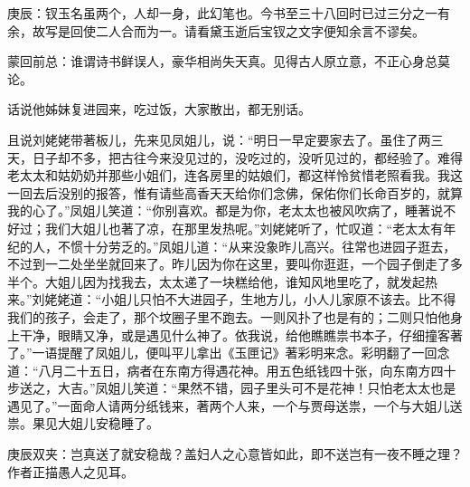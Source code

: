 \begin{parag}
    \begin{note}庚辰：钗玉名虽两个，人却一身，此幻笔也。今书至三十八回时已过三分之一有余，故写是回使二人合而为一。请看黛玉逝后宝钗之文字便知余言不谬矣。\end{note}
\end{parag}


\begin{parag}
    \begin{note}蒙回前总：谁谓诗书鲜误人，豪华相尚失天真。见得古人原立意，不正心身总莫论。\end{note}
\end{parag}


\begin{parag}
    话说他姊妹复进园来，吃过饭，大家散出，都无别话。
\end{parag}


\begin{parag}
    且说刘姥姥带著板儿，先来见凤姐儿，说：“明日一早定要家去了。虽住了两三天，日子却不多，把古往今来没见过的，没吃过的，没听见过的，都经验了。难得老太太和姑奶奶并那些小姐们，连各房里的姑娘们，都这样怜贫惜老照看我。我这一回去后没别的报答，惟有请些高香天天给你们念佛，保佑你们长命百岁的，就算我的心了。”凤姐儿笑道：“你别喜欢。都是为你，老太太也被风吹病了，睡著说不好过；我们大姐儿也著了凉，在那里发热呢。”刘姥姥听了，忙叹道：“老太太有年纪的人，不惯十分劳乏的。”凤姐儿道：“从来没象昨儿高兴。往常也进园子逛去，不过到一二处坐坐就回来了。昨儿因为你在这里，要叫你逛逛，一个园子倒走了多半个。大姐儿因为找我去，太太递了一块糕给他，谁知风地里吃了，就发起热来。”刘姥姥道：“小姐儿只怕不大进园子，生地方儿，小人儿家原不该去。比不得我们的孩子，会走了，那个坟圈子里不跑去。一则风扑了也是有的；二则只怕他身上干净，眼睛又净，或是遇见什么神了。依我说，给他瞧瞧祟书本子，仔细撞客著了。”一语提醒了凤姐儿，便叫平儿拿出《玉匣记》著彩明来念。彩明翻了一回念道：“八月二十五日，病者在东南方得遇花神。用五色纸钱四十张，向东南方四十步送之，大吉。”凤姐儿笑道：“果然不错，园子里头可不是花神！只怕老太太也是遇见了。”一面命人请两分纸钱来，著两个人来，一个与贾母送祟，一个与大姐儿送祟。果见大姐儿安稳睡了。\begin{note}庚辰双夹：岂真送了就安稳哉？盖妇人之心意皆如此，即不送岂有一夜不睡之理？作者正描愚人之见耳。\end{note}
\end{parag}


